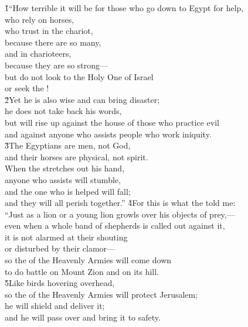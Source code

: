 \begin{poetry}
\poeml {}
\v{1}``How terrible it will be for those who go down to Egypt for help, \\
\poemll    who rely on horses, \\
\poeml who trust in the chariot, \\
\poemll    because there are so many, \\
\poeml and in charioteers, \\
\poemll    because they are so strong--- \\
\poeml but do not look to the Holy One of Israel \\
\poemll    or seek the ! \\
\poeml \v{2}Yet he is also wise and can bring disaster; \\
\poemll    he does not take back his words, \\
\poeml but will rise up against the house of those who practice evil \\
\poemll    and against anyone who assists people who work iniquity. \\
\poeml \v{3}The Egyptians are men, not God, \\
\poemll    and their horses are physical, not spirit. \\
\poeml When the  stretches out his hand, \\
\poemll    anyone who assists will stumble, \\
\poeml and the one who is helped will fall; \\
\poemll    and they will all perish together.''
\poeml \v{4}For this is what the  told me: \\
\poeml ``Just as a lion or a young lion growls over his objects of prey,--- \\
\poemll    even when a whole band of shepherds is called out against it, \\
\poeml it is not alarmed at their shouting \\
\poemll    or disturbed by their clamor--- \\
\poeml so the  of the Heavenly Armies will come down \\
\poemll    to do battle on Mount Zion and on its hill. \\
\poeml \v{5}Like birds hovering overhead, \\
\poemll    so the  of the Heavenly Armies will protect Jerusalem; \\
\poeml he will shield and deliver it; \\
\poemll    and he will pass over and bring it to safety.
\end{poetry}

